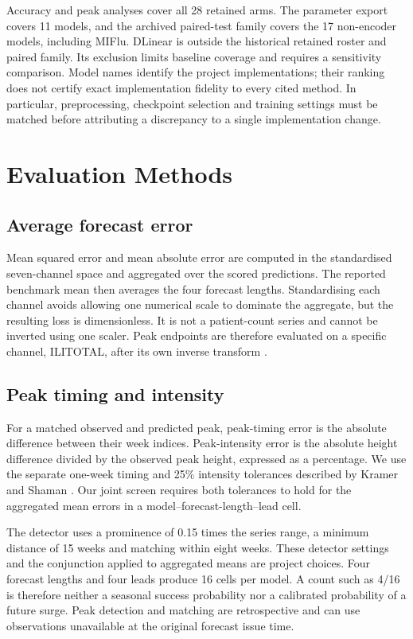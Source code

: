 \documentclass[journal,twoside,print]{ieeecolor}
\begin{document}
Accuracy and peak analyses cover all 28 retained arms. The parameter export covers 11 models, and the archived paired-test family covers the 17 non-encoder models, including MIFlu. DLinear is outside the historical retained roster and paired family. Its exclusion limits baseline coverage and requires a sensitivity comparison. Model names identify the project implementations; their ranking does not certify exact implementation fidelity to every cited method. In particular, preprocessing, checkpoint selection and training settings must be matched before attributing a discrepancy to a single implementation change.

\section{Evaluation Methods}
\subsection{Average forecast error}
Mean squared error and mean absolute error are computed in the standardised seven-channel space and aggregated over the scored predictions. The reported benchmark mean then averages the four forecast lengths. Standardising each channel avoids allowing one numerical scale to dominate the aggregate, but the resulting loss is dimensionless. It is not a patient-count series and cannot be inverted using one scaler. Peak endpoints are therefore evaluated on a specific channel, ILITOTAL, after its own inverse transform \cite{r21}.

\subsection{Peak timing and intensity}
For a matched observed and predicted peak, peak-timing error is the absolute difference between their week indices. Peak-intensity error is the absolute height difference divided by the observed peak height, expressed as a percentage. We use the separate one-week timing and 25\% intensity tolerances described by Kramer and Shaman \cite{r2}. Our joint screen requires both tolerances to hold for the aggregated mean errors in a model--forecast-length--lead cell.

The detector uses a prominence of 0.15 times the series range, a minimum distance of 15 weeks and matching within eight weeks. These detector settings and the conjunction applied to aggregated means are project choices. Four forecast lengths and four leads produce 16 cells per model. A count such as 4/16 is therefore neither a seasonal success probability nor a calibrated probability of a future surge. Peak detection and matching are retrospective and can use observations unavailable at the original forecast issue time.
\end{document}
